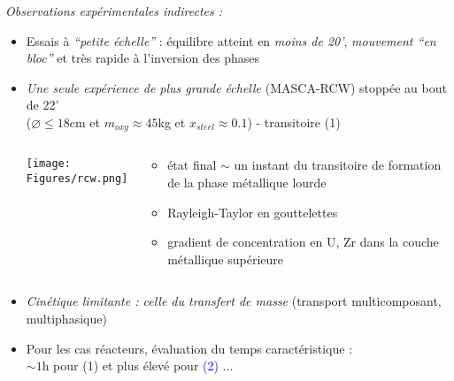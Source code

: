     \begin{frame}
    
      \emph{\small Observations expérimentales indirectes :}
      \begin{itemize}
      \item Essais à \emph{``petite échelle''} : équilibre atteint en \emph{moins de 20'}, \emph{mouvement ``en bloc''} et très rapide à l'inversion des phases
      \item \emph{Une seule expérience de plus grande échelle} (MASCA-RCW) stoppée au bout de 22' \\ ($\diameter \le 18$cm et $m_{oxy} \approx 45$kg et $x_{steel}\approx 0.1$) - transitoire \textcolor{OliveGreen}{(1)}
      \begin{columns}
\begin{column}{0.65\textwidth}
\baselineskip
\texttt{[image: Figures/rcw.png]}
\end{column}
\begin{column}{0.4\textwidth}
\hskip -0.8cm \begin{minipage}{1.1\textwidth}
  \begin{itemize}
\item état final $\sim$ un instant du transitoire de formation de la phase métallique lourde
\item Rayleigh-Taylor en gouttelettes
\item gradient de concentration en U, Zr dans la couche métallique supérieure
\end{itemize}
\end{minipage}
\end{column}
      \end{columns}
      \item \emph{Cinétique limitante : celle du transfert de masse} (transport multicomposant, multiphasique)
      \item Pour les cas réacteurs, évaluation du temps caractéristique : \\ $\sim 1$h pour \textcolor{OliveGreen}{(1)} et plus élevé pour \textcolor{blue}{(2)} ...
\end{itemize}
    \end{frame}

